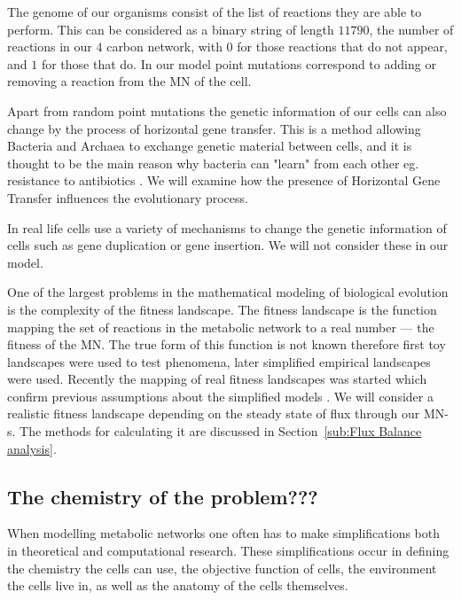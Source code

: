 \documentclass[a4paper,12pt]{article}
\begin{document}
	The genome of our organisms consist of the list of reactions they are able to perform. This can be considered as a binary string of length $11790$, the number of reactions in our $4$ carbon network, with $0$ for those reactions that do not appear, and $1$ for those that do. In our model point mutations correspond to adding or removing a reaction from the MN of the cell.

	Apart from random point mutations  the genetic information of our cells can also change by the process of horizontal gene transfer. This is a method allowing Bacteria and Archaea to exchange genetic material between cells, and it is thought to be the main reason why bacteria can "learn" from each other eg. resistance to antibiotics \cite{horizontalAntibiotics}\cite{horizontalgenetransfer}. We will examine how the presence of Horizontal Gene Transfer influences the evolutionary process.

	In real life cells use a variety of mechanisms to change the genetic information of cells such as gene duplication or gene insertion. We will not consider these in our model. 


	One of the largest problems in the mathematical modeling of biological evolution is the complexity of the fitness landscape. The fitness landscape is the function mapping the set of reactions in the metabolic network to a real number --- the fitness of the MN. The true form of this function is not known therefore first toy landscapes were used to test phenomena, later simplified empirical landscapes were used. Recently the mapping of real fitness landscapes was started which confirm previous assumptions about the simplified models \cite{fitnesslandscape}. We will consider a realistic fitness landscape depending on the steady state of flux through our MN-s. The methods for calculating it are discussed in Section~\ref{sub:Flux Balance analysis}.

	\subsection{The chemistry of the problem???}
	\label{sub:artificial_chemistries}


	When modelling metabolic networks one often has to make simplifications both in theoretical and computational research. These simplifications occur in defining the chemistry the cells can use, the objective function of cells, the environment the cells live in, as well as the anatomy of the cells themselves. %
	
\end{document}
